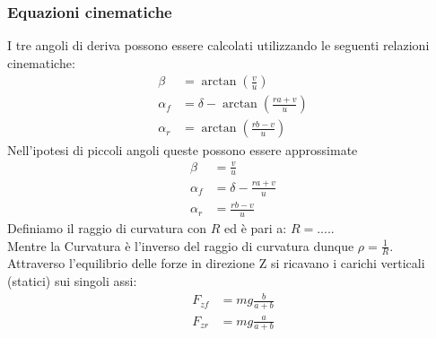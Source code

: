 \subsubsection{Equazioni cinematiche}
I tre angoli di deriva possono essere calcolati utilizzando le seguenti relazioni cinematiche:
\begin{align}
\beta & = \arctan(\frac{v}{u})\\
\alpha_f & = \delta - \arctan(\frac{ra+v}{u})\\
\alpha_r & = \arctan(\frac{rb-v}{u})
\end{align}
Nell'ipotesi di piccoli angoli queste possono essere approssimate
\begin{align}
\beta & = \frac{v}{u}\\
\alpha_f & = \delta - \frac{ra+v}{u} \label{eq:alfa front} \\
\alpha_r & = \frac{rb-v}{u} \label{eq: alfa rear}
\end{align}
Definiamo il raggio di curvatura con $R$ ed è pari a: $R=....$.\\
Mentre la Curvatura è l'inverso del raggio di curvatura dunque $\rho = \frac{1}{R}$.\\
Attraverso l'equilibrio delle forze in direzione Z si ricavano i carichi verticali (statici) sui singoli assi:
\begin{align}
F_{zf} & = mg \frac{b}{a+b}\\
F_{zr} & = mg \frac{a}{a+b}
\end{align}

